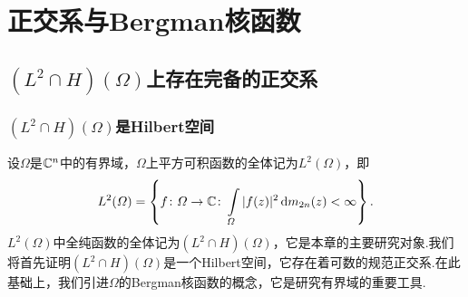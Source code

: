 \chapter{正交系与Bergman核函数\label{chap3}}

\section{$(L^2\cap H)(\Omega)$上存在完备的正交系\label{sec3.1}}
\subsection{$(L^2\cap H)(\Omega)$是Hilbert空间}
设$\Omega$是$\mathbb C^n$中的有界域，$\Omega$上平方可积函数的全体记为$L^2(\Omega)$，即
\[L^2(\varOmega)=\left\{f\colon\varOmega\to\mathbb C\colon\int\limits_{\varOmega}|f(z)|^2\mathop{}\!\mathrm{d} m_{2n}(z)<\infty\right\}.\]
$L^2(\Omega)$中全纯函数的全体记为$(L^2\cap H)(\Omega)$，它是本章的主要研究对象.我们将首先证明$(L^2\cap H)(\Omega)$是一个Hilbert空间，它存在着可数的规范正交系.在此基础上，我们引进$\Omega$的Bergman核函数的概念，它是研究有界域的重要工具.

